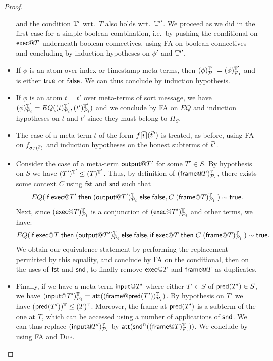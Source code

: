 \begin{proof}
\begin{itemize}
     and the condition $\mathbb{T}'$ wrt.\ $T$ also holds wrt.\ $\mathbb{T}''$.
     We proceed as we did in the first case for a simple boolean combination,
     i.e.\ by pushing the conditional on $\textsf{exec} @ T$ underneath boolean
     connectives, using \textsc{FA} on boolean connectives and concluding
     by induction hypotheses on $\phi'$ and $\mathbb{T}''$.
   \item If $\phi$ is an atom over index or timestamp meta-terms,
     then $(\phi)^{\mathbb{T}'}_{\mathcal{P}_1} = (\phi)^{\mathbb{T}'}_{\mathcal{P}_1}$
     and is either $\textsf{true}$ or $\textsf{false}$. We can thus conclude
     by induction hypothesis.
   \item If $\phi$ is an atom $t = t'$ over meta-terms of sort message,
     we have $(\phi)^{\mathbb{T}'}_{\mathcal{P}_i} =
      EQ((t)^{\mathbb{T}'}_{\mathcal{P}_i},(t')^{\mathbb{T}'}_{\mathcal{P}_i})$ and
     we conclude by \textsc{FA} on $EQ$ and induction hypotheses
     on $t$ and $t'$ since they must belong to $H_S$.
   \item The case of a meta-term $t$ of the form $f[\pvec i](\pvec t')$
     is treated, as before, using \textsc{FA} on $f_{\sigma_\I(\pvec i)}$
     and induction hypotheses on the honest subterms of $\pvec t'$.
   \item Consider the case of a meta-term $\textsf{output} @ T'$ for some $T' \in S$.
     By hypothesis on $S$ we have $(T')^{\mathbb{T}'}_{} \leq (T)^{\mathbb{T}'}_{}$.
     Thus, by definition of $(\textsf{frame} @ T)^{\mathbb{T}}_{\mathcal{P}_i}$,
     there exists some context $C$ using $\mathsf{fst}$ and $\mathsf{snd}$
     such that 
     $$EQ(
     \textsf{if}\; \textsf{exec} @ T' \;\textsf{then}\; (\textsf{output} @ T')^{\mathbb{T}}_{\mathcal{P}_i}
     \;\textsf{else}\; \textsf{false},
     C[(\textsf{frame} @ T)^{\mathbb{T}}_{\mathcal{P}_i}]) \sim \textsf{true}.$$
     Next, since $(\textsf{exec} @ T)^{\mathbb{T}}_{\mathcal{P}_i}$
     is a conjunction of
     $(\textsf{exec} @ T')^{\mathbb{T}}_{\mathcal{P}_i}$ and other terms, we have:
     $$EQ(
     \textsf{if}\; \textsf{exec} @ T \;\textsf{then}\; (\textsf{output} @ T')^{\mathbb{T}}_{\mathcal{P}_i}
     \;\textsf{else}\; \textsf{false},
     \textsf{if}\; \textsf{exec} @ T \;\textsf{then}\; C[(\textsf{frame} @ T)^{\mathbb{T}}_{\mathcal{P}_i}])
     \sim \textsf{true}.$$
     We obtain our equivalence statement
     by performing the replacement permitted by this equality,
     and conclude by \textsc{FA} on the conditional, then on the
     uses of $\mathsf{fst}$ and $\mathsf{snd}$, to finally remove $\textsf{exec} @ T$ and
     $\textsf{frame} @ T$ as duplicates.
   \item Finally, if we have a meta-term $\textsf{input} @ T'$ where either $T' \in S$
     of $\textsf{pred}(T') \in S$, we have
     $(\textsf{input} @ T')^{\mathbb{T}}_{\mathcal{P}_i} =
      \mathsf{att}((\textsf{frame} @ \textsf{pred}(T'))^{\mathbb{T}}_{\mathcal{P}_i})$.
     By hypothesis on $T'$ we have
     $(\textsf{pred}(T'))^{\mathbb{T}}_{} \leq (T)^{\mathbb{T}}_{}$.
     Moreover, the frame at $\textsf{pred}(T')$ is a subterm of the one at $T$,
     which can be accessed using a number of applications of $\mathsf{snd}$.
     We can thus replace
     $(\textsf{input} @ T')^{\mathbb{T}}_{\mathcal{P}_i}$
     by $\mathsf{att}(\mathsf{snd}^n((\textsf{frame} @ T)^{\mathbb{T}}_{\mathcal{P}_i}))$.
     We conclude by using \textsc{FA} and \textsc{Dup}.
  \end{itemize}
\end{proof}

